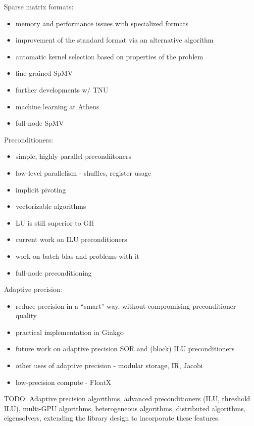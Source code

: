 

Sparse matrix formats:
\begin{itemize}
    \item memory and performance issues with specialized formats
    \item improvement of the standard format via an alternative algorithm
    \item automatic kernel selection based on properties of the problem
    \item fine-grained SpMV
    \item further developments w/ TNU
    \item machine learning at Athens
    \item full-node SpMV
\end{itemize}

Preconditioners:
\begin{itemize}
    \item simple, highly parallel precondiitoners
    \item low-level parallelism - shuffles, register usage
    \item implicit pivoting
    \item vectorizable algorithms
    \item LU is still superior to GH
    \item current work on ILU preconditioners
    \item work on batch blas and problems with it
    \item full-node preconditioning
\end{itemize}

Adaptive precision:
\begin{itemize}
    \item reduce precision in a ``smart'' way, without compromising
          preconditioner quality
    \item practical implementation in Ginkgo
    \item future work on adaptive precision SOR and (block) ILU preconditioners
    \item other uses of adaptive precision - modular storage, IR, Jacobi
    \item low-precision compute - FloatX
\end{itemize}

TODO: Adaptive precision algorithms, advanced preconditioners (ILU, threshold
ILU), multi-GPU algorithms, heterogeneous algorithms, distributed algorithms,
eigensolvers, extending the library design to incorporate these features.


